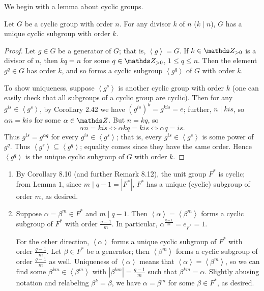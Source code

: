 \documentclass{homework}
\begin{document}
\begin{solution}
  We begin with a lemma about cyclic groups.
  \begin{lemma}{}
    Let $G$ be a cyclic group with order $n$. For any divisor $k$ of $n$ ($k\mid n$), $G$ has a
    unique cyclic subgroup with order $k$.
  \end{lemma}
  \begin{proof}[Proof]
    Let $g\in G$ be a generator of $G$; that is, $\left<g \right> =G$. If $k\in \Z_{>0}$ is a
    divisor of $n$, then $kq=n$ for some $q\in \Z_{>0}$, $1\le q\le n$. Then the element $g^q\in G$
    has order $k$, and so forms a cyclic subgroup $\left<g^q \right> $ of $G$ with order $k$.

    To show uniqueness, suppose $\left<g^s \right> $ is another cyclic group with order $k$ (one can
    easily check that all subgroups of a cyclic group are cyclic). Then for any $g^{is}\in \left<g^s
    \right>$, by Corollary 2.42 we have $(g^{is})^k=g^{kis}=e$; further, $n\mid kis$, so $\alpha
    n=kis$ for some $\alpha\in \Z$. But $n=kq$, so \[
      \alpha n=kis \iff \alpha kq=kis \iff \alpha q=is
    .\] Thus $g^{is}=g^{\alpha q}$ for every $g^{is}\in \left<g^s \right>$; that is, every
    $g^{is}\in \left<g^s \right> $ is some power of $g^{q}$. Thus $\left<g^s \right> \subseteq
    \left<g^q \right> $; equality comes since they have the same order. Hence $\left<g^q \right>$ is
    the unique cyclic subgroup of $G$ with order $k$.
  \end{proof}
  
  \begin{enumerate}[label=(\alph*)]
    \item By Corollary 8.10 (and further Remark 8.12), the unit group $F^*$ is cyclic; from Lemma
      $1$, since $m\mid q-1=\left| F^* \right| $, $F^*$ has a unique (cyclic) subgroup of order $m$,
      as desired.
    \item Suppose $\alpha=\beta^m\in F^*$ and $m\mid q-1$. Then $\left<\alpha \right> =\left<\beta^m
      \right>$ forms a cyclic subgroup of $F^*$ with order $\frac{q-1}{m}$. In particular,
      $\alpha^{\frac{q-1}{m}}=e_{F^*}=1$.

      For the other direction, $\left<\alpha \right>$ forms a unique cyclic subgroup of $F^*$ with
      order $\frac{q-1}{m}$. Let $\beta\in F^*$ be a generator; then $\left<\beta^m \right> $ forms
      a cyclic subgroup of order $\frac{q-1}{m}$ as well. Uniqueness of $\left<\alpha \right>$ means
      that $\left<\alpha \right> =\left<\beta^m \right>$, so we can find some $\beta^{km}\in
      \left<\beta^m \right> $ with $\left| \beta^{km} \right|=\frac{q-1}{m} $ such that
      $\beta^{km}=\alpha$. Slightly abusing notation and relabeling $\beta^{k}=\beta$, we have
      $\alpha=\beta^m$ for some $\beta\in F^*$, as desired.


\end{enumerate}
\end{solution}
\end{document}
